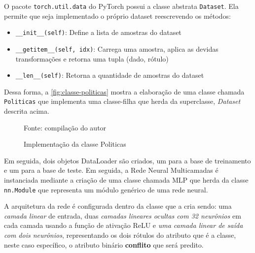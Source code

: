 O pacote \texttt{torch.util.data} do PyTorch possui a classe abstrata \texttt{Dataset}. Ela permite que seja implementado o próprio dataset reescrevendo os métodos: 

\begin{itemize}	
	\item \verb|__init__(self)|: Define a lista de amostras do dataset
	\item \verb|__getitem__(self, idx)|: Carrega uma amostra, aplica as devidas transformações e retorna uma tupla (dado, rótulo)
	\item \verb|__len__(self)|: Retorna a quantidade de amostras do dataset
\end{itemize}

Dessa forma, a \autoref{fig:classe-politicas} mostra a elaboração de uma classe chamada \texttt{Politicas} que implementa uma classe-filha que herda da superclasse, \textit{Dataset} descrita acima.

\begin{figure}[h!]
	\centering
	\caption{Implementação da classe Politicas}
	
	\label{fig:classe-politicas}
	{\scriptsize Fonte: compilação do autor}
\end{figure}

Em seguida, dois objetos DataLoader são criados, um para a base de treinamento e um para a base de teste. Em seguida, a Rede Neural Multicamadas é instanciada mediante a criação de uma classe chamada MLP que herda da classe \texttt{nn.Module} que representa um módulo genérico de uma rede neural. 

A arquitetura da rede é configurada dentro da classe que a cria sendo: uma\textit{ camada linear} de entrada, duas \textit{camadas lineares ocultas com 32 neurônios} em cada camada usando a função de ativação ReLU e \textit{uma camada linear de saída com dois neurônios}, representando os dois rótulos do atributo que é a classe, neste caso específico, o atributo binário \textbf{conflito} que será predito. 

